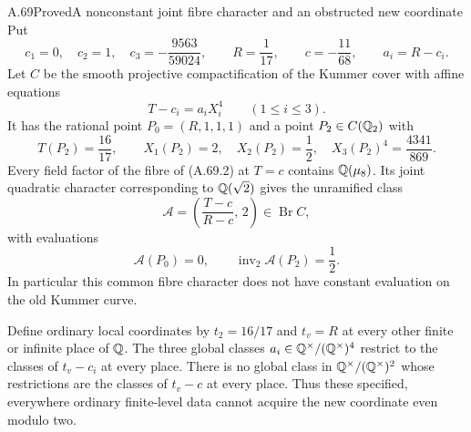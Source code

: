 \begin{statement}{A.69}{Proved}{A nonconstant joint fibre character and an obstructed new coordinate}
Put
\[
 c_1=0,\quad c_2=1,\quad c_3=-\frac{9563}{59024},
 \qquad R=\frac1{17},\qquad c=-\frac{11}{68},
 \qquad a_i=R-c_i.
 \tag{A.69.1}
\]
Let $C$ be the smooth projective compactification of the Kummer
cover with affine equations
\[
                 T-c_i=a_iX_i^4\qquad(1\le i\le3).
 \tag{A.69.2}
\]
It has the rational point $P_0=(R,1,1,1)$ and a point
$P_2\in C(\mathbb Q_2)$ with
\[
 T(P_2)=\frac{16}{17},\qquad X_1(P_2)=2,
 \quad X_2(P_2)=\frac12,
 \quad X_3(P_2)^4=\frac{4341}{869}.
 \tag{A.69.3}
\]
Every field factor of the fibre of (A.69.2) at $T=c$
contains $\mathbb Q(\mu_8)$.  Its joint quadratic character
corresponding to $\mathbb Q(\sqrt2)$ gives the unramified class
\[
        \mathcal A=
          \left(\frac{T-c}{R-c},\,2\right)
                              \in\operatorname{Br}C,
 \tag{A.69.4}
\]
with evaluations
\[
 \mathcal A(P_0)=0,\qquad
            \operatorname{inv}_2\mathcal A(P_2)=\frac12.
 \tag{A.69.5}
\]
In particular this common fibre character does not have constant
evaluation on the old Kummer curve.

Define ordinary local coordinates by $t_2=16/17$ and
$t_v=R$ at every other finite or infinite place of $\mathbb Q$.
The three global classes $a_i\in\mathbb Q^\times/(\mathbb Q^\times)^4$
restrict to the classes of $t_v-c_i$ at every place.
There is no global class in $\mathbb Q^\times/(\mathbb Q^\times)^2$
whose restrictions are the classes of $t_v-c$ at every place.
Thus these specified, everywhere ordinary finite-level data
cannot acquire the new coordinate even modulo two.
\end{statement}
